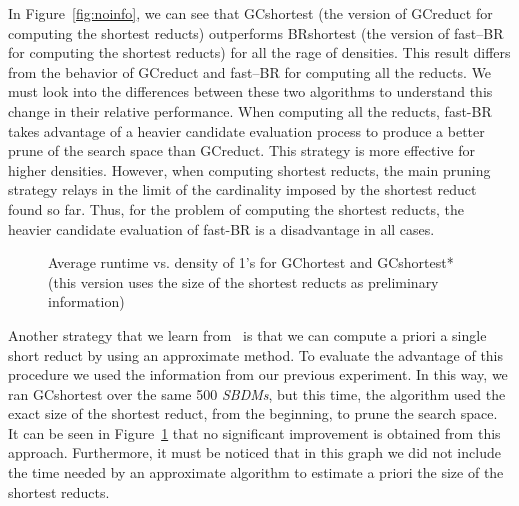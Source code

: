 \documentclass[authoryear,11pt]{elsarticle}
\begin{document}
  In Figure~\ref{fig:noinfo}, we can see that GCshortest (the version of GCreduct for computing the shortest reducts) outperforms BRshortest (the version of fast--BR for computing the shortest reducts) for all the rage of densities. This result differs from the behavior of GCreduct and fast--BR for computing all the reducts. We must look into the differences between these two algorithms to understand this change in their relative performance. When computing all the reducts, fast-BR takes advantage of a heavier candidate evaluation process to produce a better prune of the search space than GCreduct. This strategy is more effective for higher densities. However, when computing shortest reducts, the main pruning strategy relays in the limit of the cardinality imposed by the shortest reduct found so far. Thus, for the problem of computing the shortest reducts, the heavier candidate evaluation of fast-BR is a disadvantage in all cases.
  
  \begin{figure}[htb]
	  \begin{minipage}{.48\linewidth}  	
	  	\begin{center}
	  	\end{center}
	  	\caption{Average runtime vs. density of 1's for GCshortest and BRshortest.\bigskip}
	  	\label{fig:noinfo}
	  \end{minipage}
	  \begin{minipage}{.48\linewidth}  
	  	\begin{center}
	  	\end{center}
	  	\caption{Average runtime vs. density of 1's for GChortest and GCshortest* (this version uses the size of the shortest reducts as preliminary information)}
	  	\label{fig:info}
	  \end{minipage}
  \end{figure}  

 Another strategy that we learn from~\cite{Lin04} is that we can compute a priori a single short reduct by using an approximate method. To evaluate the advantage of this procedure we used the information from our previous experiment. In this way, we ran GCshortest over the same 500 \textit{SBDMs}, but this time, the algorithm used the exact size of the shortest reduct, from the beginning, to prune the search space. It can be seen in Figure~\ref{fig:info} that no significant improvement is obtained from this approach. Furthermore, it must be noticed that in this graph we did not include the time needed by an approximate algorithm to estimate a priori the size of the shortest reducts.
 
\end{document}

